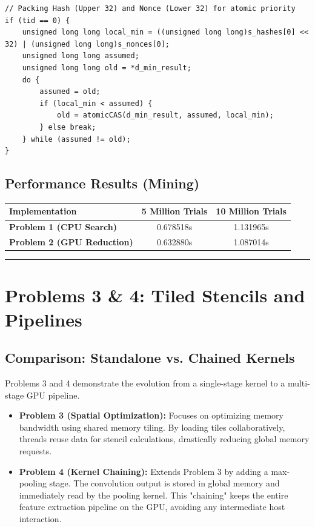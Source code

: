 \documentclass[11pt]{article}
\begin{document}
\begin{lstlisting}
// Packing Hash (Upper 32) and Nonce (Lower 32) for atomic priority
if (tid == 0) {
    unsigned long long local_min = ((unsigned long long)s_hashes[0] << 32) | (unsigned long long)s_nonces[0];
    unsigned long long assumed;
    unsigned long long old = *d_min_result;
    do {
        assumed = old;
        if (local_min < assumed) {
            old = atomicCAS(d_min_result, assumed, local_min);
        } else break;
    } while (assumed != old);
}
\end{lstlisting}

\subsection*{Performance Results (Mining)}
\begin{center}
\begin{tabular}{@{}lcc@{}}
\toprule
Implementation & 5 Million Trials & 10 Million Trials \\
\midrule
\textbf{Problem 1 (CPU Search)} & 0.678518s & 1.131965s \\
\textbf{Problem 2 (GPU Reduction)} & 0.632880s & 1.087014s \\
\bottomrule
\end{tabular}
\end{center}

\noindent\rule{\textwidth}{0.4pt}

\section*{\color{white}Problems 3 \& 4: Tiled Stencils and Pipelines}

\subsection*{Comparison: Standalone vs. Chained Kernels}
Problems 3 and 4 demonstrate the evolution from a single-stage kernel to a multi-stage GPU pipeline.
\begin{itemize}
    \item \textbf{Problem 3 (Spatial Optimization):} Focuses on optimizing memory bandwidth using shared memory tiling. By loading tiles collaboratively, threads reuse data for stencil calculations, drastically reducing global memory requests.
    \item \textbf{Problem 4 (Kernel Chaining):} Extends Problem 3 by adding a max-pooling stage. The convolution output is stored in global memory and immediately read by the pooling kernel. This "chaining" keeps the entire feature extraction pipeline on the GPU, avoiding any intermediate host interaction.
\end{itemize}
\end{document}
